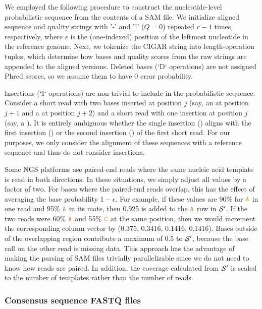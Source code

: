 \documentclass[10pt]{article}
\begin{document}
We employed the following procedure to construct the nucleotide-level probabilistic sequence from the contents of a SAM file.
We initialize aligned sequence and quality strings with '-' and '!' ($Q=0$) repeated $r-1$ times, respectively, where $r$ is the (one-indexed) position of the leftmost nucleotide in the reference genome.
Next, we tokenize the CIGAR string into length-operation tuples, which determine how bases and quality scores from the raw strings are appended to the aligned versions.
Deleted bases (`D` operations) are not assigned Phred scores, so we assume them to have 0 error probability.

Insertions (`I` operations) are non-trivial to include in the probabilistic sequence.
Consider a short read with two bases inserted at position $j$ (say, an  at position $j+1$ and a  at position $j+2$) and a short read with one insertion at position $j$ (say, a ).
It is entirely ambiguous whether the single insertion () aligns with the first insertion () or the second insertion () of the first short read. 
For our purposes, we only consider the alignment of these sequences with a reference sequence and thus do not consider insertions.

Some NGS platforms use paired-end reads where the same nucleic acid template is read in both directions.
In these situations, we simply adjust all values by a factor of two.
For bases where the paired-end reads overlap, this has the effect of averaging the base probability $1-\epsilon$.
For example, if these values are 90\% for $\texttt{\textcolor{brown}{A}}$ in one read and 95\% $\texttt{\textcolor{brown}{A}}$ in its mate, then 0.925 is added to the $\texttt{\textcolor{brown}{A}}$ row in $\mathcal{S}'$.
If the two reads were 60\% $\texttt{\textcolor{brown}{A}}$ and 55\% $\texttt{\textcolor{brown}{C}}$ at the same position, then we would increment the corresponding column vector by ($0.375$, $0.341\bar{6}$, $0.141\bar{6}$, $0.141\bar{6}$).
Bases outside of the overlapping region contribute a maximum of 0.5 to $\mathcal{S}'$, because the base call on the other read is missing data.
This approach has the advantage of making the parsing of SAM files trivially parallelizable since we do not need to know how reads are paired.
In addition, the coverage calculated from $\mathcal{S}'$ is scaled to the number of templates rather than the number of reads.


\subsubsection{Consensus sequence FASTQ files}
\label{fastq_construction}
\end{document}
